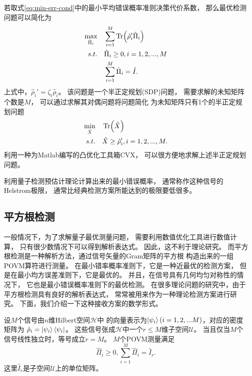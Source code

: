 若取式\ref{eq:min-err-cond}中的最小平均错误概率准则决策代价系数，
那么最优检测问题可以简化为
\begin{equation}
\begin{split}
\max_{\hat{\Pi}_i}  \quad  &  \sum_{i=1}^M \Tr(\hat{\rho}_i'\hat{\Pi}_i) \\
s.t. \quad  & \hat{\Pi}_i \ge 0, i=1,2,...,M   \\
     \quad  & \sum_{i=1}^M \hat{\Pi}_i = \hat{I}.
\end{split}
\end{equation}
上式中，$\hat{\rho}_i' = \zeta_i \hat{\rho}_i$。
该问题是一个半正定规划(SDP)问题，
需要求解的未知矩阵个数是$M$，
可以通过求解其对偶问题将问题简化
为未知矩阵只有1个的半正定规划问题\cite{eldar2003designing}
\begin{equation}
\begin{split}
\min_{\hat{X}}  \quad & \Tr(\hat{X}) \\
s.t.          \quad & \hat{X} \ge \hat{\rho}_i', i=1,2,...,M.
\end{split}
\end{equation}
利用一种为Matlab编写的凸优化工具箱CVX，
可以很方便地求解上述半正定规划问题\cite{cvx,gb08}。

利用量子检测预估计理论计算出来的最小错误概率，
通常称作这种信号的Helstrom极限，
通常比经典检测方案所能达到的极限要低很多\cite{helstrom1976quantum}。



\subsection{平方根检测}
一般情况下，为了求解量子最优测量问题，
需要利用数值优化工具进行数值计算，
只有很少数情况下可以得到解析表达式。
因此，这不利于理论研究。
而平方根检测是一种解析方法，通过信号矢量的Gram矩阵的平方根
构造出来的一组POVM算符进行测量\cite{hausladen1994pretty,hausladen1996classical}。
在最小错率概率准则下，它是一种近最优的检测方案，
但是在最小均方误差准则下，它是最优的。
并且，在信号具有几何均匀对称性的情况下，
它也是最小错误概率准则下的最优检测\cite{kato1999quantum,eldar2001quantum,cariolaro2010performance,cariolaro2010theory}。
在很多理论问题的研究中，由于平方根检测具有良好的解析表达式，
常常被用来作为一种理论检测方案进行研究\cite{hausladen1996classical,sasaki1998quantum,guha2012polar}。
下面，我们介绍一下这种接收方案的数学形式。

设$M$个信号由$n$维Hilbert空间$\mathcal{H}$中
的向量表示为$\ket{\psi_i}(i=1,2,...M)$，对应的密度矩阵为
$\hat{\rho}_i = \ket{\psi_i} \bra{\psi_i}$。
这些信号张成$\mathcal{H}$中一个$r\le M$维子空间$\mathcal{U}$。
当且仅当$M$个信号线性独立时，等号成立$r=M$。
$M$个POVM测量满足
\begin{equation}
\hat{\Pi}_i \ge 0, \sum_{i=1}^M \hat{\Pi}_i = \hat{I}_r.
\end{equation}
这里$\hat{I}_r$是子空间$\mathcal{U}$上的单位矩阵。

